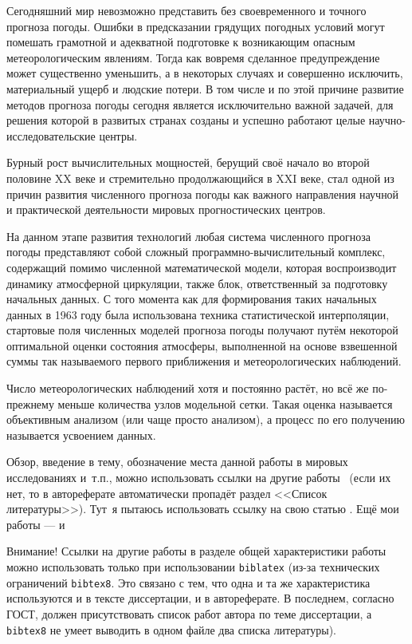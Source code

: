 {\actuality} Сегодняшний мир невозможно представить без своевременного и точного прогноза погоды. Ошибки в предсказании грядущих погодных условий могут помешать грамотной и адекватной подготовке к возникающим опасным метеорологическим явлениям. Тогда как вовремя сделанное предупреждение может существенно уменьшить, а в некоторых случаях и совершенно исключить, материальный ущерб и людские потери. В том числе и по этой причине развитие методов прогноза погоды сегодня является исключительно важной задачей, для решения которой в развитых странах созданы и успешно работают целые научно-исследовательские центры.


Бурный рост вычислительных мощностей, берущий своё начало во второй половине XX веке и стремительно продолжающийся в XXI веке, стал одной из причин развития численного прогноза погоды как важного направления научной и практической деятельности мировых прогностических центров.

На данном этапе развития технологий любая система численного прогноза погоды представляют собой сложный программно-вычислительный комплекс, содержащий помимо численной математической модели, которая воспроизводит динамику атмосферной циркуляции, также блок, ответственный за подготовку начальных данных. С того момента как для формирования таких начальных данных в 1963 году \cite{Gandin-1963} была использована техника статистической интерполяции, стартовые поля численных моделей прогноза погоды получают путём некоторой оптимальной оценки состояния атмосферы, выполненной на основе взвешенной суммы так называемого первого приближения и метеорологических наблюдений.


Число метеорологических наблюдений хотя и постоянно растёт, но всё же по-прежнему меньше количества узлов модельной сетки. Такая оценка называется объективным анализом (или чаще просто анализом), а процесс по его получению называется усвоением данных.

Обзор, введение в тему, обозначение места данной работы в
мировых исследованиях и~т.\:п., можно использовать ссылки на другие
работы~ (если их нет, то в автореферате
автоматически пропадёт раздел <<Список литературы>>).
Тут~я пытаюсь использовать ссылку на свою статью \cite{Mizyak-2013}. Ещё мои работы --- \cite{Slyaeva-2013} и \cite{Tolstykh-2015} 

Внимание! Ссылки
на другие работы в разделе общей характеристики работы можно
использовать только при использовании \verb!biblatex! (из-за технических
ограничений \verb!bibtex8!. Это связано с тем, что одна и та же
характеристика используются и в тексте диссертации, и в
автореферате. В последнем, согласно ГОСТ, должен присутствовать список
работ автора по теме диссертации, а \verb!bibtex8! не умеет выводить в одном
файле два списка литературы).

